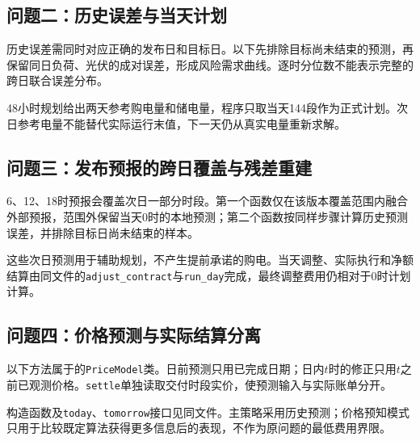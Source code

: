 \clearpage
\subsection{问题二：历史误差与当天计划}

历史误差需同时对应正确的发布日和目标日。以下先排除目标尚未结束的预测，再保留同日负荷、光伏的成对误差，形成风险需求曲线。逐时分位数不能表示完整的跨日联合误差分布。



48小时规划给出两天参考购电量和储电量，程序只取当天144段作为正式计划。次日参考电量不能替代实际运行末值，下一天仍从真实电量重新求解。



\clearpage
\subsection{问题三：发布预报的跨日覆盖与残差重建}

6、12、18时预报会覆盖次日一部分时段。第一个函数仅在该版本覆盖范围内融合外部预报，范围外保留当天0时的本地预测；第二个函数按同样步骤计算历史预测误差，并排除目标日尚未结束的样本。



这些次日预测用于辅助规划，不产生提前承诺的购电。当天调整、实际执行和净额结算由同文件的\texttt{adjust\_contract}与\texttt{run\_day}完成，最终调整费用仍相对于0时计划计算。

\clearpage
\subsection{问题四：价格预测与实际结算分离}

以下方法属于的\texttt{PriceModel}类。日前预测只用已完成日期；日内$t$时的修正只用$t$之前已观测价格。\texttt{settle}单独读取交付时段实价，使预测输入与实际账单分开。





构造函数及\texttt{today}、\texttt{tomorrow}接口见同文件。主策略采用历史预测；价格预知模式只用于比较既定算法获得更多信息后的表现，不作为原问题的最低费用界限。

\endgroup

